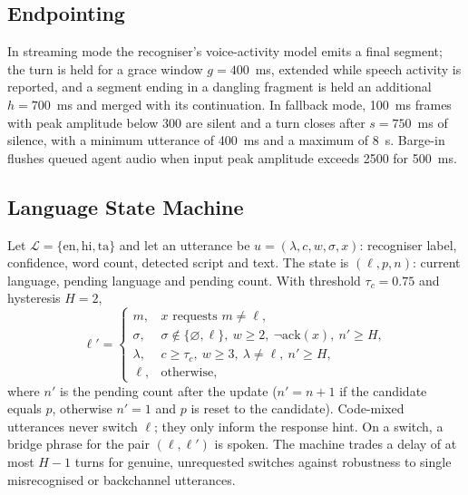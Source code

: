 \documentclass[conference]{IEEEtran}
\begin{document}
\subsection{Endpointing}
In streaming mode the recogniser's voice-activity model emits a final segment; the turn is held for a grace window $g=400$~ms, extended while speech activity is reported, and a segment ending in a dangling fragment is held an additional $h=700$~ms and merged with its continuation. In fallback mode, 100~ms frames with peak amplitude below 300 are silent and a turn closes after $s=750$~ms of silence, with a minimum utterance of 400~ms and a maximum of 8~s. Barge-in flushes queued agent audio when input peak amplitude exceeds 2500 for 500~ms.

\subsection{Language State Machine}
Let $\mathcal{L}=\{\mathrm{en},\mathrm{hi},\mathrm{ta}\}$ and let an utterance be $u=(\lambda,c,w,\sigma,x)$: recogniser label, confidence, word count, detected script and text. The state is $(\ell,p,n)$: current language, pending language and pending count. With threshold $\tau_c=0.75$ and hysteresis $H=2$,
\begin{equation}
\ell'=\begin{cases}
m, & x \text{ requests } m\neq\ell,\\
\sigma, & \sigma\notin\{\varnothing,\ell\},\ w\geq 2,\ \neg\mathrm{ack}(x),\ n'\geq H,\\
\lambda, & c\geq\tau_c,\ w\geq 3,\ \lambda\neq\ell,\ n'\geq H,\\
\ell, & \text{otherwise},
\end{cases}
\label{eq:lang}
\end{equation}
where $n'$ is the pending count after the update ($n'=n+1$ if the candidate equals $p$, otherwise $n'=1$ and $p$ is reset to the candidate). Code-mixed utterances never switch $\ell$; they only inform the response hint. On a switch, a bridge phrase for the pair $(\ell,\ell')$ is spoken. The machine trades a delay of at most $H-1$ turns for genuine, unrequested switches against robustness to single misrecognised or backchannel utterances.
\end{document}

